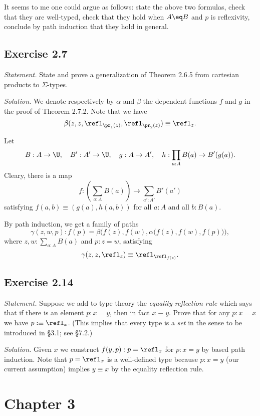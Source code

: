 \documentclass[12pt]{article}
\begin{document}
It seems to me one could argue as follows: state the above two formulas, check that they are well-typed, check that they hold when $A\eq B$ and $p$ is reflexivity, conclude by path induction that they hold in general.


\subsection{Exercise 2.7}

\emph{Statement.} State and prove a generalization of Theorem 2.6.5 from cartesian products to $\Sigma$-types. 

\nn\emph{Solution.} We denote respectively by $\alpha$ and $\beta$ the dependent functions $f$ and $g$ in the proof of Theorem 2.7.2. Note that we have 
$$
\beta(z,z,\refl_{\pr_1(z)},\refl_{\pr_2(z)})\equiv\refl_z.
$$

Let 
$$
B:A\to\U,\quad B':A'\to\U,\quad g:A\to A',\quad h:\prod_{a:A}B(a)\to B'(g(a)).
$$ 
Cleary, there is a map 
$$
f:\left(\sum_{a:A}B(a)\right)\to\sum_{a':A'}B'(a')
$$ 
satisfying $f(a,b)\equiv (g(a),h(a,b))$ for all $a:A$ and all $b:B(a)$. 

By path induction, we get a family of paths 
$$
\gamma(z,w,p):f(p)=\beta\Big(f(z),f(w),\alpha\big(f(z),f(w),f(p)\big)\Big),
$$ 
where $z,w:\sum_{a:A}B(a)$ and $p:z=w$, satisfying 
$$
\gamma(z,z,\refl_z)\equiv\refl_{\refl_{f(z)}}.
$$


\subsection{Exercise 2.14}

\emph{Statement.} Suppose we add to type theory the \emph{equality reflection rule} which says that if there is an element $p:x=y$, then in fact $x\equiv y$. Prove that for any $p:x=x$ we have $p:\equiv\refl_x$. (This implies that every type is a \emph{set} in the sense to be introduced in \S3.1; see \S7.2.)

\nn\emph{Solution.} Given $x$ we construct $f(y,p):p=\refl_x$ for $p:x=y$ by based path induction. Note that $p=\refl_x$ is a well-defined type because $p:x=y$ (our current assumption) implies $y\equiv x$ by the equality reflection rule.


\section{Chapter 3}
\end{document}
